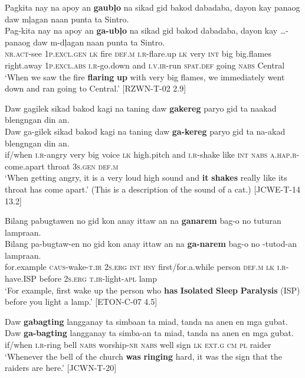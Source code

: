 \ea
Pagkita  nay  na  apoy  an  \textbf{gaubļo}  na  sikad  gid  bakod   dabadaba,  dayon  kay  panaog  daw  mļagan  naan  punta   ta   Sintro. \\\smallskip
\gll Pag-kita  nay  na  apoy  an  \textbf{ga-ubļo}  na  sikad  gid  bakod   dabadaba,  dayon  kay  …-panaog  daw  m-dļagan  naan  punta   ta   Sintro. \\
\textsc{nr.act}-see  1\textsc{p.excl.gen}  \textsc{lk}  fire  \textsc{def.m}  \textsc{i.r}-flare.up  \textsc{lk}  very  \textsc{int}  big
big.flames  right.away  1\textsc{p.excl.abs}  \textsc{i.r}-go.down  and  \textsc{i.v.ir}-run  \textsc{spat.def} going
\textsc{nabs}  Central \\
\glt ‘When we saw the fire \textbf{flaring} \textbf{up}  with very big flames, we immediately went down and ran going to Central.’ [RZWN-T-02 2.9]
\z

\ea
Daw  gagilek  sikad  bakod  kagi  na  taning  daw  \textbf{gakereg}  paryo gid  ta  naakad  blengngan  din  an.\\\smallskip
\gll Daw  ga-gilek  sikad  bakod  kagi  na  taning  daw  \textbf{ga-kereg}  paryo gid  ta  na-akad  blengngan  din  an.\\
if/when  \textsc{i.r}-angry  very  big  voice  \textsc{lk}  high.pitch  and  \textsc{i.r}-shake  like
\textsc{int}  \textsc{nabs}  \textsc{a.hap.r}-come.apart  throat  3\textsc{s.gen}  \textsc{def.m} \\
\glt ‘When getting angry, it is a very loud high sound and \textbf{it} \textbf{shakes} really like its throat has come apart.’ (This is a description of the sound of a cat.) [JCWE-T-14 13.2]
\z

\ea
Bilang  pabugtawen  no  gid  kon  anay  ittaw  an  na \textbf{ganarem}  bag-o  no  tuturan  lampraan. \\\smallskip
\gll Bilang  pa-bugtaw-en  no  gid  kon  anay  ittaw  an  na \textbf{ga-narem}  bag-o  no  \emptyset{}-tutod-an  lampraan. \\
for.example  \textsc{caus}-wake-\textsc{t.ir}  2\textsc{s.erg}  \textsc{int}  \textsc{hsy}  first/for.a.while  person  \textsc{def.m}  \textsc{lk}
\textsc{i.r}-have.ISP  before  2\textsc{s.erg}  \textsc{t.ir}-light-\textsc{apl}  lamp \\
\glt ‘For example, first wake up the person who \textbf{has} \textbf{Isolated} \textbf{Sleep} \textbf{Paralysis} (ISP) before you light a lamp.’ [ETON-C-07 4.5]
\z

\ea
Daw  \textbf{gabagting}  langganay  ta  simbaan  ta  miad, tanda  na  anen  en  mga  gubat. \\\smallskip
\gll Daw  \textbf{ga-bagting}  langganay  ta  simba-an  ta  miad, tanda  na  anen  en  mga  gubat. \\
if/when  \textsc{i.r}-ring  bell  \textsc{nabs}  worship-\textsc{nr} \textsc{nabs}  well sign  \textsc{lk}  \textsc{ext.g}  \textsc{cm}  \textsc{pl}  raider \\
\glt ‘Whenever the bell of the church \textbf{was} \textbf{ringing} hard, it was the sign that the raiders are here.’ [JCWN-T-20]
\z


